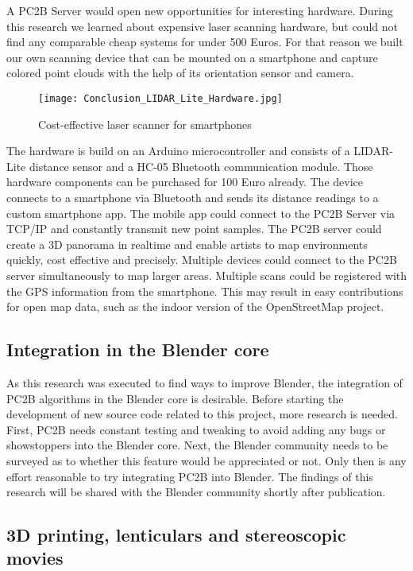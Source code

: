 A PC2B Server would open new opportunities for interesting hardware. During this research we learned about expensive laser scanning hardware, but could not find any comparable cheap systems for under 500 Euros. For that reason we built our own scanning device that can be mounted on a smartphone and capture colored point clouds with the help of its orientation sensor and camera.

\begin{figure}[h]
	\centering
	\texttt{[image: Conclusion\_LIDAR\_Lite\_Hardware.jpg]}
	\caption{Cost-effective laser scanner for smartphones}
	\label{fig:conclusion_lidar_lite_hardware}
\end{figure}

The hardware is build on an Arduino microcontroller and consists of a LIDAR-Lite distance sensor and a HC-05 Bluetooth communication module. Those hardware components can be purchased for 100 Euro already. The device connects to a smartphone via Bluetooth and sends its distance readings to a custom smartphone app. The mobile app could connect to the PC2B Server via TCP/IP and constantly transmit new point samples. The PC2B server could create a 3D panorama in realtime and enable artists to map environments quickly, cost effective and precisely. Multiple devices could connect to the PC2B server simultaneously to map larger areas. Multiple scans could be registered with the GPS information from the smartphone. This may result in easy contributions for open map data, such as the indoor version of the OpenStreetMap project.

\subsection{Integration in the Blender core}

As this research was executed to find ways to improve Blender, the integration of PC2B algorithms in the Blender core is desirable. Before starting the development of new source code related to this project, more research is needed. First, PC2B needs constant testing and tweaking to avoid adding any bugs or showstoppers into the Blender core. Next, the Blender community needs to be surveyed as to whether this feature would be appreciated or not. Only then is any effort reasonable to try integrating PC2B into Blender. The findings of this research will be shared with the Blender community shortly after publication.

\subsection{3D printing, lenticulars and stereoscopic movies}

